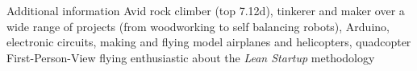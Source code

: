 \begin{rubric}{Additional information}
%
%
\entry*[Interests]%
  Avid rock climber (top 7.12d), tinkerer and maker over a wide range of projects (from woodworking to self balancing robots), Arduino, electronic circuits, 
  making and flying model airplanes and helicopters, quadcopter First-Person-View flying
  enthusiastic about the \textit{Lean Startup} methodology
%
%
\end{rubric}
